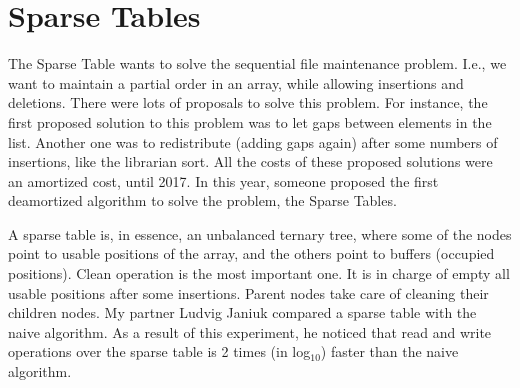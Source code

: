 \documentclass[a4paper, 10pt]{article}
\begin{document}


\section{Sparse Tables}
The Sparse Table wants to solve the sequential file maintenance problem. I.e., we want to maintain a partial order in an array, while allowing insertions and deletions. There were lots of proposals to solve this problem. For instance, the first proposed solution to this problem was to let gaps between elements in the list. Another one was to redistribute (adding gaps again) after some numbers of insertions, like the librarian sort. All the costs of these proposed solutions were an amortized cost, until 2017. In this year, someone proposed the first deamortized algorithm to solve the problem, the Sparse Tables.

A sparse table is, in essence, an unbalanced ternary tree, where some of the nodes point to usable positions of the array, and the others point to buffers (occupied positions). Clean operation is the most important one. It is in charge of empty all usable positions after some insertions. Parent nodes take care of cleaning their children nodes. My partner Ludvig Janiuk compared a sparse table with the naive algorithm. As a result of this experiment, he noticed that read and write operations over the sparse table is 2 times (in log$_{10}$) faster than the naive algorithm.



\end{document}
